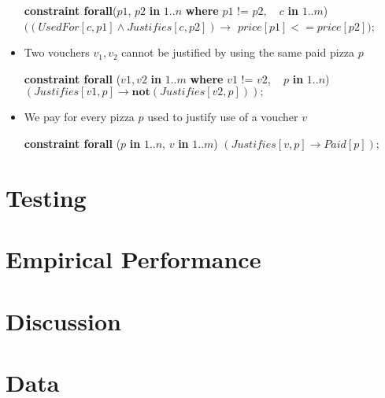 \documentclass[conference]{IEEEtran}
\newcommand\tab[1][0.3cm]{\hspace*{#1}}
\begin{document}
\begin{itemize}
\begin{algorithmic}
\State \textbf{constraint forall}($p1$, $p2$ \textbf{in} $1..n$ \textbf{where} $p1 \text{ != } p2,$
\State \tab\tab\tab\tab\tab\tab\tab\tab $\text{ } c$ \textbf{in} $1..m$)
\State \tab\tab $((UsedFor[c, p1] \land Justifies[c, p2]) \rightarrow$
\State \tab\tab\tab\tab $price[p1] <= price[p2]);$
\\
\end{algorithmic}
\item Two vouchers $v_1, v_2$ cannot be justified by using the same paid pizza $p$
\begin{algorithmic}
\State \textbf{constraint forall} ($v1, v2$ \textbf{in} $1..m$ \textbf{where} $v1$ != $v2,$
\State \tab\tab\tab\tab\tab\tab\tab\tab $\text{ } p$ \textbf{in} $1..n$)
\State \tab\tab $(Justifies[v1, p] \rightarrow \textbf{not} (Justifies[v2, p]));$
\\
\end{algorithmic}
\item We pay for every pizza $p$ used to justify use of a voucher $v$
\begin{algorithmic}
\State \textbf{constraint forall} ($p$ \textbf{in} $1..n$, $v$ \textbf{in} $1..m$)
\State \tab\tab $(Justifies[v, p] \rightarrow Paid[p]);$
\\
\end{algorithmic}
\end{itemize}
\section{Testing}
\section{Empirical Performance}
\section{Discussion}
\section{Data}
\end{document}
